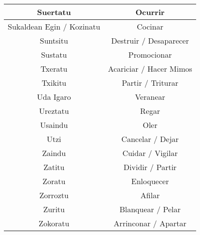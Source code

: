 \documentclass[11pt, a4paper]{article}
\begin{document}
\begin{longtable}{cc}
    \hline
    Suertatu                      & Ocurrir                        \\
    \hline
    Sukaldean Egin / Kozinatu     & Cocinar                        \\
    \hline
    Suntsitu                      & Destruir / Desaparecer         \\
    \hline
    Sustatu                       & Promocionar                    \\
    \hline
    Txeratu                       & Acariciar / Hacer Mimos        \\
    \hline
    Txikitu                       & Partir / Triturar              \\
    \hline
    Uda Igaro                     & Veranear                       \\
    \hline
    Ureztatu                      & Regar                          \\
    \hline
    Usaindu                       & Oler                           \\
    \hline
    Utzi                          & Cancelar / Dejar               \\
    \hline
    Zaindu                        & Cuidar / Vigilar               \\
    \hline
    Zatitu                        & Dividir / Partir               \\
    \hline
    Zoratu                        & Enloquecer                     \\
    \hline
    Zorroztu                      & Afilar                         \\
    \hline
    Zuritu                        & Blanquear / Pelar              \\
    \hline
    Zokoratu                      & Arrinconar / Apartar           \\
    \hline
\end{longtable}
\end{document}
